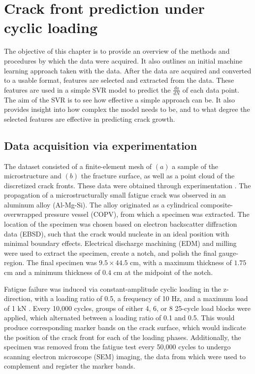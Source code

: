 \chapter[Crack front prediction under cyclic loading]{Crack front prediction under \\ cyclic loading}
The objective of this chapter is to provide an overview of the methods and procedures by which the data were acquired.  It also outlines an initial machine learning approach taken with the data.  After the data are acquired and converted to a usable format, features are selected and extracted from the data.  These features are used in a simple SVR model to predict the $\frac{da}{dN}$ of each data point.  The aim of the SVR is to see how effective a simple approach can be.  It also provides insight into how complex the model needs to be, and to what degree the selected features are effective in predicting crack growth.

\section{Data acquisition via experimentation}

The dataset consisted of a finite-element mesh of $(a)$ a sample of the microstructure and $(b)$ the fracture surface, as well as a point cloud of the discretized crack fronts.  These data were obtained through experimentation \cite{spear2014}.  The propagation of a microstructurally small fatigue crack was observed in an aluminum alloy (Al-Mg-Si).  The alloy originated as a cylindrical composite-overwrapped pressure vessel (COPV), from which a specimen was extracted.  The location of the specimen was chosen based on electron backscatter diffraction data (EBSD), such that the crack would nucleate in an ideal position with minimal boundary effects.  Electrical discharge machining (EDM) and milling were used to extract the specimen, create a notch, and polish the final gauge-region.  The final specimen was $9.5 \times 44.5$ cm, with a maximum thickness of $1.75$ cm and a minimum thickness of $0.4$ cm at the midpoint of the notch.

Fatigue failure was induced via constant-amplitude cyclic loading in the z-direction, with a loading ratio of 0.5, a frequency of 10 Hz, and a maximum load of 1 kN \cite{spear2014}.  Every 10,000 cycles, groups of either 4, 6, or 8 25-cycle load blocks were applied, which alternated between a loading ratio of 0.1 and 0.5.  This would produce corresponding marker bands on the crack surface, which would indicate the position of the crack front for each of the loading phases.  Additionally, the specimen was removed from the fatigue test every 50,000 cycles to undergo scanning electron microscope (SEM) imaging, the data from which were used to complement and register the marker bands.

